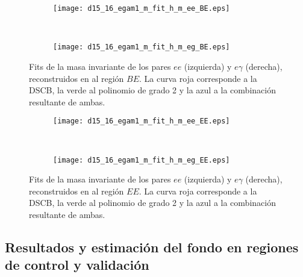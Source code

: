 \begin{figure}

	\begin{subfigure}{0.5\textwidth}
		\texttt{[image: d15\_16\_egam1\_m\_fit\_h\_m\_ee\_BE.eps]} 
	\end{subfigure}
	~
	\begin{subfigure}{0.5\textwidth}
		\texttt{[image: d15\_16\_egam1\_m\_fit\_h\_m\_eg\_BE.eps]}
	\end{subfigure}

	
	\caption{Fits de la masa invariante de los pares $ee$ (izquierda) y $e\gamma$ (derecha), reconstruidos en al región $BE$. La curva roja corresponde a la DSCB, la verde al polinomio de grado 2 y la azul a la combinación resultante de ambas.}
\label{fits_BE}
\end{figure}


\begin{figure}

	\begin{subfigure}{0.5\textwidth}
		\texttt{[image: d15\_16\_egam1\_m\_fit\_h\_m\_ee\_EE.eps]} 
	\end{subfigure}
	~
	\begin{subfigure}{0.5\textwidth}
		\texttt{[image: d15\_16\_egam1\_m\_fit\_h\_m\_eg\_EE.eps]}
	\end{subfigure}

	
	\caption{Fits de la masa invariante de los pares $ee$ (izquierda) y $e\gamma$ (derecha), reconstruidos en al región $EE$. La curva roja corresponde a la DSCB, la verde al polinomio de grado 2 y la azul a la combinación resultante de ambas.}
\label{fits_EE}
\end{figure}


\subsection{Resultados y estimación del fondo en regiones de control y validación} \label{sec:resultados}

